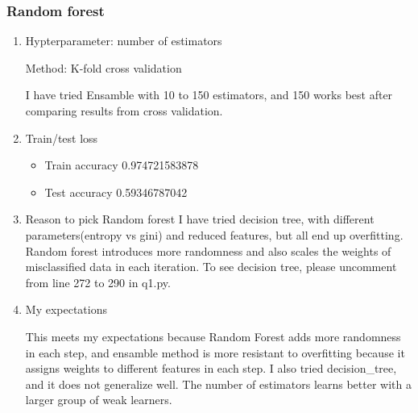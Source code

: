\documentclass[letterpaper, 12pt]{article}
\begin{document}
\subsubsection{Random forest}
\begin{enumerate}

    \item Hypterparameter: number of estimators
    
	Method: K-fold cross validation

	I have tried Ensamble with 10 to 150 estimators, and 150 works best after comparing results from cross validation.

	\item Train/test loss
	\begin{itemize}
     \item  Train accuracy 0.974721583878
     \item Test accuracy 0.59346787042
        \end{itemize}
      
      \item Reason to pick Random forest
      I have tried decision tree, with different parameters(entropy vs gini) and reduced features, but all end up overfitting. Random forest introduces more randomness and also scales the weights of misclassified data in each iteration. To see decision tree, please uncomment from line 272 to 290 in q1.py.
      
      \item My expectations
      
      This meets my expectations because Random Forest adds more randomness in each step, and ensamble method is more resistant to overfitting because it assigns weights to different features in each step. I also tried decision\_tree, and it does not generalize well.
      The number of estimators learns better with a larger group of weak learners.
  
\end{enumerate}
\end{document}
